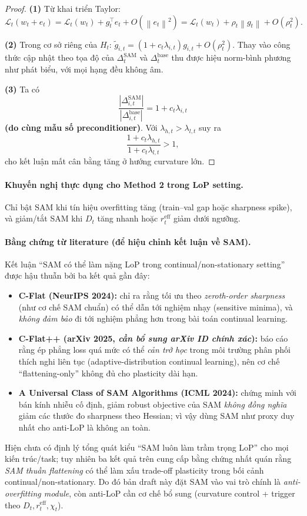 \documentclass[11pt]{article}
\newcommand{\norm}[1]{\left\lVert #1 \right\rVert}
\begin{document}
\begin{proof}
\textbf{(1)} Từ khai triển Taylor:
\[
\mathcal{L}_t(w_t+e_t)
=
\mathcal{L}_t(w_t)+g_t^\top e_t+O(\norm{e_t}^2)
=
\mathcal{L}_t(w_t)+\rho_t\norm{g_t}+O(\rho_t^2).
\]

\textbf{(2)} Trong cơ sở riêng của $H_t$:
$\tilde g_{i,t}=(1+c_t\lambda_{i,t})g_{i,t}+O(\rho_t^2)$.
Thay vào công thức cập nhật theo tọa độ của $\Delta_t^{\mathrm{SAM}}$ và $\Delta_t^{\mathrm{base}}$
thu được hiệu norm-bình phương như phát biểu, với mọi hạng đều không âm.

\textbf{(3)} Ta có
\[
\frac{|\Delta_{i,t}^{\mathrm{SAM}}|}{|\Delta_{i,t}^{\mathrm{base}}|}
=
1+c_t\lambda_{i,t}
\]
\textbf{(do cùng mẫu số preconditioner)}.
Với $\lambda_{h,t}>\lambda_{l,t}$ suy ra
\[
\frac{1+c_t\lambda_{h,t}}{1+c_t\lambda_{l,t}}>1,
\]
cho kết luận mất cân bằng tăng ở hướng curvature lớn.
\end{proof}

\paragraph{Khuyến nghị thực dụng cho Method 2 trong LoP setting.}
Chỉ bật SAM khi tín hiệu overfitting tăng (train--val gap hoặc sharpness spike), và giảm/tắt SAM khi
$D_t$ tăng nhanh hoặc $r_t^{\mathrm{eff}}$ giảm dưới ngưỡng.

\paragraph{Bằng chứng từ literature (để hiệu chỉnh kết luận về SAM).}
Kết luận ``SAM có thể làm nặng LoP trong continual/non-stationary setting'' được hậu thuẫn bởi ba kết quả gần đây:
\begin{itemize}
\item \textbf{C-Flat (NeurIPS 2024):} chỉ ra rằng tối ưu theo \emph{zeroth-order sharpness} (như cơ chế SAM chuẩn) có thể dẫn tới nghiệm nhạy (sensitive minima), và \emph{không đảm bảo} đi tới nghiệm phẳng hơn trong bài toán continual learning.
\item \textbf{C-Flat++ (arXiv 2025, \textit{cần bổ sung arXiv ID chính xác}):} báo cáo rằng ép phẳng loss quá mức có thể \emph{cản trở học} trong môi trường phân phối thích nghi liên tục (adaptive-distribution continual learning), nên cơ chế ``flattening-only'' không đủ cho plasticity dài hạn.
\item \textbf{A Universal Class of SAM Algorithms (ICML 2024):} chứng minh với bán kính nhiễu cố định, giảm robust objective của SAM \emph{không đồng nghĩa} giảm các thước đo sharpness theo Hessian; vì vậy dùng SAM như proxy duy nhất cho anti-LoP là không an toàn.
\end{itemize}
Hiện chưa có định lý tổng quát kiểu ``SAM luôn làm trầm trọng LoP'' cho mọi kiến trúc/task; tuy nhiên ba kết quả trên cung cấp bằng chứng nhất quán rằng \emph{SAM thuần flattening} có thể làm xấu trade-off plasticity trong bối cảnh continual/non-stationary.
Do đó bản draft này đặt SAM vào vai trò chính là \emph{anti-overfitting module}, còn anti-LoP cần cơ chế bổ sung (curvature control + trigger theo $D_t,r_t^{\mathrm{eff}},\chi_t$).
\end{document}

